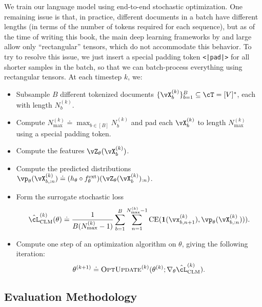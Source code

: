 \documentclass[../../book-main.tex]{subfiles}
\begin{document}
We train our language model using end-to-end stochastic optimization. One remaining issue is that, in practice, different documents in a batch have different lengths (in terms of the number of tokens required for each sequence), but as of the time of writing this book, the main deep learning frameworks by and large allow only ``rectangular'' tensors, which do not accommodate this behavior. To try to resolve this issue, we just insert a special padding token \texttt{<|pad|>} for all shorter samples in the batch, so that we can batch-process everything using rectangular tensors. At each timestep \(k\), we:
\begin{itemize}
    \item Subsample \(B\) different tokenized documents \(\{\vX_{b}^{(k)}\}_{b = 1}^{B} \subseteq \cT = [V]^{*}\), each with length \(N_{b}^{(k)}\).
    \item Compute \(N_{\max}^{(k)} \doteq \max_{b \in [B]}N_{b}^{(k)}\) and pad each \(\vX_{b}^{(k)}\) to length \(N_{\max}^{(k)}\) using a special padding token.
    \item Compute the features \(\vZ_{\theta}(\vX_{b}^{(k)})\).
    \item Compute the predicted distributions \(\vp_{\theta}(\vX_{b, :n}^{(k)}) \doteq (h_{\theta} \circ f_{\theta}^{\ext})(\vZ_{\theta}(\vX_{b}^{(k)})_{:n})\).
    \item Form the surrogate stochastic loss 
    \begin{equation}
        \hat{\cL}_{\mathrm{CLM}}^{(k)}(\theta) \doteq \frac{1}{B(N_{\max}^{(k)} - 1)}\sum_{b = 1}^{B}\sum_{n = 1}^{N_{\max}^{(k)}-1}\CE(\vone(\vx_{b, n + 1}^{(k)}), \vp_{\theta}(\vX_{b, :n}^{(k)}))).
    \end{equation}
    \item Compute one step of an optimization algorithm on \(\theta\), giving the following iteration:
    \begin{equation}
        \theta^{(k + 1)} \doteq \textsc{OptUpdate}^{(k)}(\theta^{(k)}; \nabla_{\theta}\hat{\cL}_{\mathrm{CLM}}^{(k)}).
    \end{equation}
\end{itemize}

\subsection{Evaluation Methodology} \label{sub:clm_text_evals}
\end{document}
